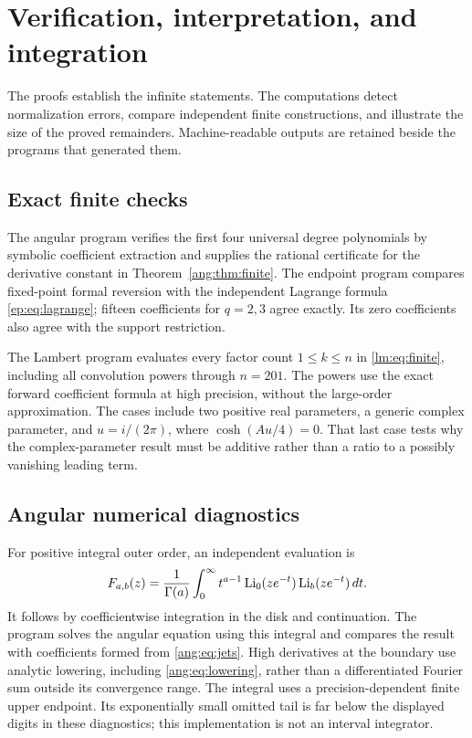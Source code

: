 \section{Verification, interpretation, and integration}
\label{sec:verification}

The proofs establish the infinite statements. The computations detect
normalization errors, compare independent finite constructions, and
illustrate the size of the proved remainders. Machine-readable outputs
are retained beside the programs that generated them.

\subsection{Exact finite checks}

The angular program verifies the first four universal degree polynomials
by symbolic coefficient extraction and supplies the rational certificate
for the derivative constant in Theorem~\ref{ang:thm:finite}.
The endpoint program compares fixed-point formal reversion with the
independent Lagrange formula \eqref{ep:eq:lagrange}; fifteen
coefficients for $q=2,3$ agree exactly. Its zero coefficients also
agree with the support restriction.

The Lambert program evaluates every factor count $1\le k\le n$
in \eqref{lm:eq:finite}, including all convolution powers through
$n=201$. The powers use the exact forward coefficient formula at
high precision, without the large-order approximation. The cases
include two positive real parameters, a generic complex parameter,
and $u=i/(2\pi)$, where $\cosh(Au/4)=0$. That last case tests
why the complex-parameter result must be additive rather than a
ratio to a possibly vanishing leading term.

\subsection{Angular numerical diagnostics}

For positive integral outer order, an independent evaluation is
\begin{equation}
 F_{a,b}(z)=\frac1{\Gamma(a)}\int_0^\infty
 t^{a-1}\operatorname{Li}_0(ze^{-t})\operatorname{Li}_b(ze^{-t})\,dt.
 \label{eq:numeric-integral}
\end{equation}
It follows by coefficientwise integration in the disk and continuation.
The program solves the angular equation using this integral and
compares the result with coefficients formed from
\eqref{ang:eq:jets}. High derivatives at the boundary use analytic
lowering, including \eqref{ang:eq:lowering}, rather than a
differentiated Fourier sum outside its convergence range. The
integral uses a precision-dependent finite upper endpoint. Its
exponentially small omitted tail is far below the displayed digits
in these diagnostics; this implementation is not an interval integrator.

